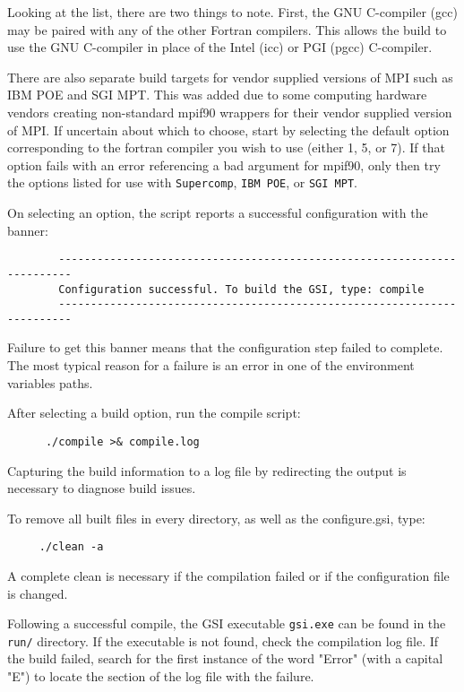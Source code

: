 Looking at the list, there are two things to note. First, the GNU C-compiler (gcc) may be 
paired with any of the other Fortran compilers. This allows the build to use the GNU C-compiler 
in place of the Intel (icc) or PGI (pgcc) C-compiler.

There are also separate build targets for vendor supplied versions 
of MPI such as IBM POE and SGI MPT. This was added due to some computing hardware vendors 
creating non-standard mpif90 wrappers for their vendor supplied version of MPI. If uncertain about 
which to choose, start by selecting the default option corresponding to the fortran compiler you wish 
to use (either 1, 5, or 7). If that option fails with an error referencing a bad argument for mpif90,
only then try the options listed for use with \verb|Supercomp|, \verb|IBM POE|, or \verb|SGI MPT|.

On selecting an option, the script reports a successful configuration with the banner:
\begin{scriptsize}
\begin{verbatim}
        ------------------------------------------------------------------------ 
        Configuration successful. To build the GSI, type: compile 
        ------------------------------------------------------------------------
\end{verbatim}
\end{scriptsize}
Failure to get this banner means that the configuration step failed to complete. The most typical reason for a failure is an error in one of the environment variables paths.

After selecting a build option, run the compile script:
\begin{small}
\begin{verbatim}
      ./compile >& compile.log
\end{verbatim}
\end{small}
Capturing the build information to a log file by redirecting the output is necessary to diagnose build issues. 

To remove all built files in every directory, as well as the configure.gsi, type:
\begin{small}
\begin{verbatim}
     ./clean -a
\end{verbatim}
\end{small}
A complete clean is necessary if the compilation failed or if the configuration file is changed.

Following a successful compile, the GSI executable \verb|gsi.exe| can be found in the \verb|run/| directory.
If the executable is not found, check the compilation log file. If the build failed, search for the first instance of the word "Error" (with a capital "E") to locate the section of the log file with the failure.

